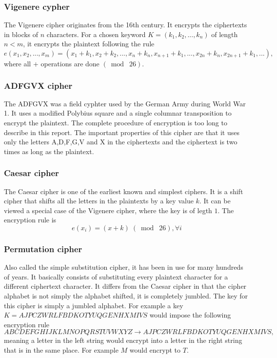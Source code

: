 \documentclass[a4paper]{article}
\begin{document}

\subsubsection*{Vigenere cypher}
The Vigenere cipher originates from the 16th century. It encrypts the ciphertexts in blocks of $n$ characters. For a chosen keyword $K = (k_{1}, k_{2}, ..., k_{n})$ of length $n < m$, it encrypts the plaintext following the rule
$$e(x_{1}, x_{2}, ...,x_{m}) = (x_{1}+k_{1}, x_{2}+k_{2}, ..., x_{n}+k_{n}, x_{n+1}+k_{1}, ...,x_{2n}+k_{n}, x_{2n+1} + k_{1}, ...),$$
where all $+$ operations are done $(\bmod\; 26)$.

\subsubsection*{ADFGVX cipher}
The ADFGVX was a field cyphter used by the German Army during World War 1. It uses a modified Polybius square and a single columnar transposition to encrypt the plaintext. The complete procedure of encryption is too long to describe in this report. The important properties of this cipher are that it uses only the letters A,D,F,G,V and X in the ciphertexts and the ciphertext is two times as long as the plaintext. 

\subsubsection*{Caesar cipher}
The Caesar cipher is one of the earliest known and simplest ciphers. It is a shift cipher that shifts all the letters in the plaintexts by a key value $k$. It can be viewed a special case of the Vigenere cipher, where the key is of legth $1$. The encryption rule is
$$e(x_{i}) = (x + k) \;(\bmod\; 26), \forall i$$

\subsubsection*{Permutation cipher}
Also called the simple substitution cipher, it has been in use for many hundreds of years. It basically consists of substituting every plaintext character for a different ciphertext character. It differs from the Caesar cipher in that the cipher alphabet is not simply the alphabet shifted, it is completely jumbled. The key for this cipher is simply a jumbled alphabet. For example a key $K = AJPCZWRLFBDKOTYUQGENHXMIVS$ would impose the following encryption rule
$$ABCDEFGHIJKLMNOPQRSTUVWXYZ \rightarrow AJPCZWRLFBDKOTYUQGENHXMIVS,$$
meaning a letter in the left string would encrypt into a letter in the right string that is in the same place. For example $M$ would encrypt to $T$.
\end{document}
